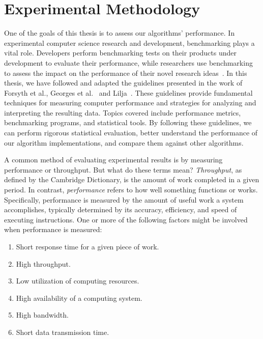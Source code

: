 \section{\label{sec:methodology}Experimental Methodology}

One of the goals of this thesis is to assess our algorithms' performance. In experimental computer science research and development, benchmarking plays a vital role. Developers perform benchmarking tests on their products under development to evaluate their performance, while researchers use benchmarking to assess the impact on the performance of their novel research ideas~\cite{DBLP_conf_oopsla_GeorgesBE07}.
In this thesis, we have followed and adapted the guidelines presented in the work of Forsyth et al.\cite{forsyth2018probability}, Georges et al.~\cite{DBLP_conf_oopsla_GeorgesBE07} and Lilja~\cite{lilja2005measuring}. These guidelines provide fundamental techniques for measuring computer performance and strategies for analyzing and interpreting the resulting data. Topics covered include performance metrics, benchmarking programs, and statistical tools. By following these guidelines, we can perform rigorous statistical evaluation, better understand the performance of our algorithm implementations, and compare them against other algorithms.

A common method of evaluating experimental results is by measuring performance or throughput. But what do these terms mean? \emph{Throughput}, as defined by the Cambridge Dictionary, is the amount of work completed in a given period. In contrast, \emph{performance} refers to how well something functions or works. Specifically, performance is measured by the amount of useful work a system accomplishes, typically determined by its accuracy, efficiency, and speed of executing instructions. One or more of the following factors might be involved when performance is measured:

\begin{enumerate}
\item Short response time for a given piece of work.
\item High throughput.
\item Low utilization of computing resources.
\item High availability of a computing system.
\item High bandwidth.
\item Short data transmission time.
\end{enumerate}

